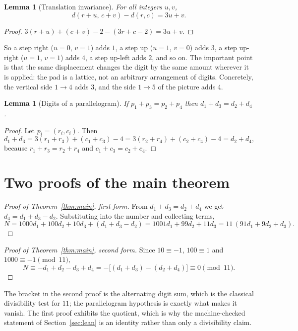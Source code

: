 \documentclass[11pt,a4paper]{article}
\newtheorem{lemma}[theorem]{Lemma}
\theoremstyle{definition}
\theoremstyle{remark}
\begin{document}
\begin{lemma}[Translation invariance]
\label{lem:affine}
For all integers $u,v$,
\[
d(r+u,\,c+v)-d(r,c)=3u+v .
\]
\end{lemma}

\begin{proof}
$3(r+u)+(c+v)-2-(3r+c-2)=3u+v$.
\end{proof}

So a step right ($u=0$, $v=1$) adds $1$, a step up ($u=1$, $v=0$) adds $3$, a step
up-right ($u=1$, $v=1$) adds $4$, a step up-left adds $2$, and so on. The important
point is that the same displacement changes the digit by the same amount wherever it
is applied: the pad is a lattice, not an arbitrary arrangement of digits. Concretely,
the vertical side $1\to4$ adds $3$, and the side $1\to5$ of the picture adds $4$.

\begin{lemma}[Digits of a parallelogram]
\label{lem:opposite}
If $p_1+p_3=p_2+p_4$ then $d_1+d_3=d_2+d_4$.
\end{lemma}

\begin{proof}
Let $p_i=(r_i,c_i)$. Then
\[
d_1+d_3=3(r_1+r_3)+(c_1+c_3)-4=3(r_2+r_4)+(c_2+c_4)-4=d_2+d_4,
\]
because $r_1+r_3=r_2+r_4$ and $c_1+c_3=c_2+c_4$.
\end{proof}

\section{Two proofs of the main theorem}
\label{sec:proof}

\begin{proof}[Proof of Theorem~\ref{thm:main}, first form]
From $d_1+d_3=d_2+d_4$ we get $d_4=d_1+d_3-d_2$. Substituting into the number and
collecting terms,
\[
N=1000d_1+100d_2+10d_3+(d_1+d_3-d_2)
  =1001d_1+99d_2+11d_3
  =11\,(91d_1+9d_2+d_3).
\]
\end{proof}

\begin{proof}[Proof of Theorem~\ref{thm:main}, second form]
Since $10\equiv-1$, $100\equiv 1$ and $1000\equiv-1\pmod{11}$,
\[
N\equiv -d_1+d_2-d_3+d_4=-\bigl[(d_1+d_3)-(d_2+d_4)\bigr]\equiv 0 \pmod{11}.
\]
\end{proof}

The bracket in the second proof is the alternating digit sum, which is the classical
divisibility test for $11$; the parallelogram hypothesis is exactly what makes it
vanish. The first proof exhibits the quotient, which is why the machine-checked
statement of Section~\ref{sec:lean} is an identity rather than only a divisibility
claim.
\end{document}
